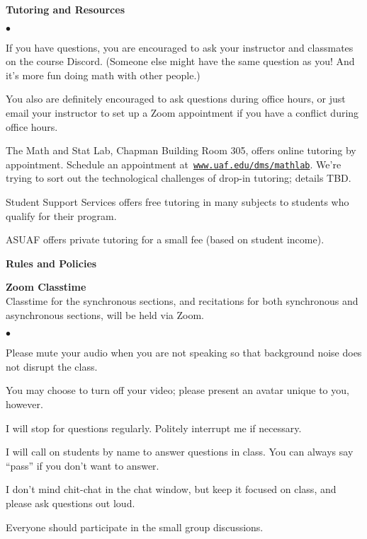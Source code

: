 \documentclass[12pt]{article}
\renewcommand{\emph}[1]{\textsf{\textbf{#1}}}
\newcommand{\localhead}[1]{\par\smallskip\textbf{#1}\nobreak\\}%
\def\heading#1{\localhead{\large\emph{#1}}}
\def\subheading#1{\localhead{\emph{#1}}}
\newenvironment{clist}%
{\bgroup\parskip 0pt\begin{list}{$\bullet$}{\partopsep 4pt\topsep 0pt\itemsep -2pt}}%
{\end{list}\egroup}%
\begin{document}
\heading{Tutoring and Resources}
\vskip -30pt\strut
\begin{clist}
	\item If you have questions, you are encouraged to ask your instructor and classmates on the course Discord. (Someone else might have the same question as you! And it's more fun doing math with other people.)
	\item You also are definitely encouraged to ask questions during office hours, or just email your instructor to set up a Zoom appointment if you have a conflict during office hours.
	\item The Math and Stat Lab, Chapman Building Room 305, offers online tutoring by appointment. Schedule an appointment at\, \href{http://www.uaf.edu/dms/mathlab/}{\texttt{www.uaf.edu/dms/mathlab}}. We're trying to sort out the technological challenges of drop-in tutoring; details TBD.%
	\item Student Support Services offers free tutoring in many subjects to students who qualify for their program.
	\item ASUAF offers private tutoring for a small fee (based on student income).
\end{clist}

\heading{Rules and Policies}
\vskip -20pt
\subheading{Zoom Classtime}
Classtime for the synchronous sections, and recitations for both synchronous and asynchronous sections, will be held via Zoom.
\begin{clist}
\item Please mute your audio when you are not speaking so that background noise does not disrupt the class.
\item You may choose to turn off your video; please present an avatar unique to you, however.
\item I will stop for questions regularly. Politely interrupt me if necessary.
\item I will call on students by name to answer questions in class. You can always say ``pass'' if you don't want to answer.
\item I don't mind chit-chat in the chat window, but keep it focused on class, and please ask questions out loud.
\item Everyone should participate in the small group discussions.
\end{clist}
\end{document}
